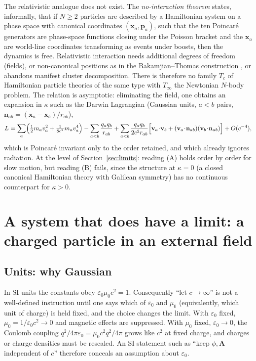 \documentclass[11pt,a4paper]{article}
\newcommand{\eps}{\varepsilon}
\newcommand{\bx}{\mathbf{x}}
\newcommand{\bv}{\mathbf{v}}
\newcommand{\bp}{\mathbf{p}}
\newcommand{\bA}{\mathbf{A}}
\theoremstyle{plain}
\theoremstyle{definition}
\theoremstyle{remark}
\begin{document}
The relativistic analogue does not exist. The \emph{no-interaction theorem}
\cite{CJS63,Leutwyler65} states, informally, that if $N\ge2$ particles are described by a
Hamiltonian system on a phase space with canonical coordinates $(\bx_a,\bp_a)$, such that the ten
Poincar\'e generators are phase-space functions closing under the Poisson bracket and the $\bx_a$ are
world-line coordinates transforming as events under boosts, then the dynamics is free.
Relativistic interaction needs additional degrees of freedom (fields), or non-canonical
positions as in the Bakamjian--Thomas construction \cite{BT53}, or abandons manifest cluster
decomposition. There is therefore no family $T_c$ of Hamiltonian particle theories of the same
type with $T_\infty$ the Newtonian $N$-body problem. The relation is asymptotic: eliminating the
field, one obtains an expansion in $\kappa$ such as the Darwin Lagrangian \cite{Darwin20} (Gaussian
units, $a<b$ pairs, $\mathbf n_{ab}=(\bx_a-\bx_b)/r_{ab}$),
\begin{equation}
L=\sum_a\Bigl(\tfrac12m_av_a^2+\tfrac{1}{8c^2}m_av_a^4\Bigr)-\sum_{a<b}\frac{q_aq_b}{r_{ab}}
+\sum_{a<b}\frac{q_aq_b}{2c^2r_{ab}}\Bigl[\bv_a\!\cdot\!\bv_b+(\bv_a\!\cdot\!\mathbf n_{ab})(\bv_b\!\cdot\!\mathbf n_{ab})\Bigr]
+O(c^{-4}),
\end{equation}
which is Poincar\'e invariant only to the order retained, and which already ignores radiation. At the
level of Section~\ref{sec:limits}: reading (A) holds order by order for slow motion, but reading (B)
fails, since the structure at $\kappa=0$ (a closed canonical Hamiltonian theory with Galilean
symmetry) has no continuous counterpart for $\kappa>0$.

\section{A system that does have a limit: a charged particle in an external field}\label{sec:EM}

\subsection{Units: why Gaussian}\label{ssec:units}
In SI units the constants obey $\eps_0\mu_0c^2=1$. Consequently ``let $c\to\infty$'' is not a
well-defined instruction until one says which of $\eps_0$ and $\mu_0$ (equivalently, which unit of
charge) is held fixed, and the choice changes the limit. With $\eps_0$ fixed, $\mu_0=1/\eps_0c^2\to0$
and magnetic effects are suppressed. With $\mu_0$ fixed, $\eps_0\to0$, the Coulomb coupling
$q^2/4\pi\eps_0=\mu_0c^2q^2/4\pi$ grows like $c^2$ at fixed charge, and charges or charge densities
must be rescaled. An SI statement such as ``keep $\phi,\bA$ independent of $c$'' therefore conceals
an assumption about $\eps_0$.
\end{document}
